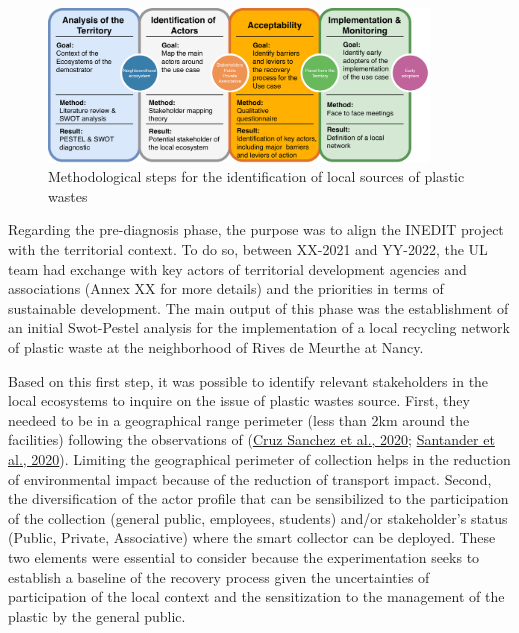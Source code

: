 \documentclass[
  11pt,
]{article}
\begin{document}
\begin{figure}[H]

{\centering \includegraphics[width=0.9\textwidth,height=\textheight]{figures/Fedoua-00.pdf}

}

\caption{\label{fig-fedoua-00}Methodological steps for the
identification of local sources of plastic wastes}

\end{figure}

Regarding the pre-diagnosis phase, the purpose was to align the INEDIT
project with the territorial context. To do so, between XX-2021 and
YY-2022, the UL team had exchange with key actors of territorial
development agencies and associations (Annex XX for more details) and
the priorities in terms of sustainable development. The main output of
this phase was the establishment of an initial Swot-Pestel analysis for
the implementation of a local recycling network of plastic waste at the
neighborhood of Rives de Meurthe at Nancy.

Based on this first step, it was possible to identify relevant
stakeholders in the local ecosystems to inquire on the issue of plastic
wastes source. First, they needeed to be in a geographical range
perimeter (less than 2km around the facilities) following the
observations of (\protect\hyperlink{ref-CruzSanchez2020}{Cruz Sanchez et
al., 2020}; \protect\hyperlink{ref-Santander2020}{Santander et al.,
2020}). Limiting the geographical perimeter of collection helps in the
reduction of environmental impact because of the reduction of transport
impact. Second, the diversification of the actor profile that can be
sensibilized to the participation of the collection (general public,
employees, students) and/or stakeholder's status (Public, Private,
Associative) where the smart collector can be deployed. These two
elements were essential to consider because the experimentation seeks to
establish a baseline of the recovery process given the uncertainties of
participation of the local context and the sensitization to the
management of the plastic by the general public.
\end{document}
